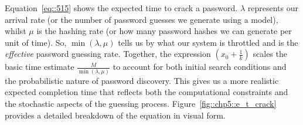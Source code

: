 Equation~\ref{eq::515} shows the expected time to crack a password. $\lambda$ represents our arrival rate (or the number of password guesses we generate using a model), whilst $\mu$ is the hashing rate (or how many password hashes we can generate per unit of time). So, $\min(\lambda, \mu)$ tells us by what our system is throttled and is the \textit{effective} password guessing rate. Together, the expression $\left(x_0 + \frac{1}{k}\right)$ scales the basic time estimate $\frac{M}{\min(\lambda, \mu)}$ to account for both initial search conditions and the probabilistic nature of password discovery. This gives us a more realistic expected completion time that reflects both the computational constraints and the stochastic aspects of the guessing process. Figure~\ref{fig::chp5::e_t_crack} provides a detailed breakdown of the equation in visual form.

%
%
%
%
%
%
%
%
%
